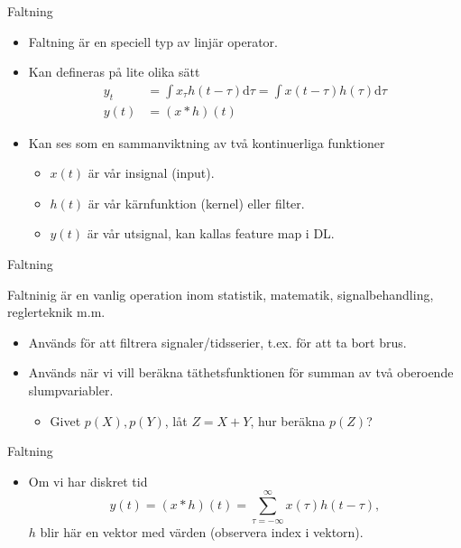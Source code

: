 \documentclass[10pt,english]{beamer}
\begin{document}
\begin{frame}{Faltning}

    \begin{itemize}
        \item Faltning är en speciell typ av linjär operator.
        \item Kan defineras på lite olika sätt
        \begin{align*}
            y_t &= \int x_{\tau} h(t - \tau) \mathrm{d}\tau = \int x(t-\tau) h(\tau) \mathrm{d}\tau \\
            y(t) &= (x * h) (t)
        \end{align*}
        \item Kan ses som en sammanviktning av två kontinuerliga funktioner
        \begin{itemize}
            \item $x(t)$ är vår insignal (input).
            \item $h(t)$ är vår kärnfunktion (kernel) eller filter.
            \item $y(t)$ är vår utsignal, kan kallas feature map i DL.
        \end{itemize}
    \end{itemize}
    
\end{frame}

\begin{frame}{Faltning}

    Faltninig är en vanlig operation inom statistik, matematik, signalbehandling, reglerteknik m.m.
    \begin{itemize}
        \item Används för att filtrera signaler/tidsserier, t.ex. för att ta bort brus.
        \item Används när vi vill beräkna täthetsfunktionen för summan av två oberoende slumpvariabler.
        \begin{itemize}
            \item Givet $p(X), p(Y)$, låt $Z = X + Y$, hur beräkna $p(Z)$?
        \end{itemize}
    \end{itemize}
    
\end{frame}

\begin{frame}{Faltning}

    \begin{itemize}
        \item Om vi har diskret tid
        \begin{equation*}
            y(t) = (x * h) (t) = \sum_{\tau = - \infty}^{\infty} x(\tau) h(t - \tau),
        \end{equation*}
        $h$ blir här en vektor med värden (observera index i vektorn).
    \end{itemize}
    
\end{frame}
\end{document}

